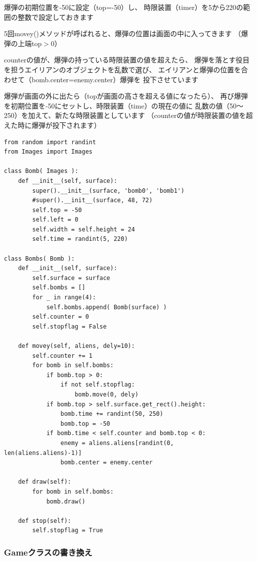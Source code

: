 \documentclass[uplatex,a4paper,11pt,oneside,openany]{jsbook}
\begin{document}
爆弾の初期位置を-50に設定（top=-50）し、
時限装置（timer）を5から220の範囲の整数で設定しておきます

5回movey()メソッドが呼ばれると、爆弾の位置は画面の中に入ってきます
（爆弾の上端top$>$0）

counterの値が、爆弾の持っている時限装置の値を超えたら、
爆弾を落とす役目を担うエイリアンのオブジェクトを乱数で選び、
エイリアンと爆弾の位置を合わせて（bomb.center=enemy.center）爆弾を
投下させています

爆弾が画面の外に出たら（topが画面の高さを超える値になったら）、
再び爆弾を初期位置を-50にセットし、時限装置（time）の現在の値に
乱数の値（50〜250）を加えて、新たな時限装置としています
（counterの値が時限装置の値を超えた時に爆弾が投下されます）

\begin{lstlisting}[caption=Class Bombs,label=p007]
from random import randint
from Images import Images

class Bomb( Images ):
    def __init__(self, surface):
        super().__init__(surface, 'bomb0', 'bomb1')
        #super().__init__(surface, 48, 72)
        self.top = -50
        self.left = 0
        self.width = self.height = 24
        self.time = randint(5, 220)

class Bombs( Bomb ):
    def __init__(self, surface):
        self.surface = surface
        self.bombs = []
        for _ in range(4):
            self.bombs.append( Bomb(surface) )
        self.counter = 0
        self.stopflag = False

    def movey(self, aliens, dely=10):
        self.counter += 1
        for bomb in self.bombs:
            if bomb.top > 0:
                if not self.stopflag:
                    bomb.move(0, dely)
            if bomb.top > self.surface.get_rect().height:
                bomb.time += randint(50, 250)
                bomb.top = -50
            if bomb.time < self.counter and bomb.top < 0:
                enemy = aliens.aliens[randint(0, len(aliens.aliens)-1)]
                bomb.center = enemy.center

    def draw(self):
        for bomb in self.bombs:
            bomb.draw()

    def stop(self):
        self.stopflag = True
\end{lstlisting}

\subsubsection{Gameクラスの書き換え}
\end{document}
